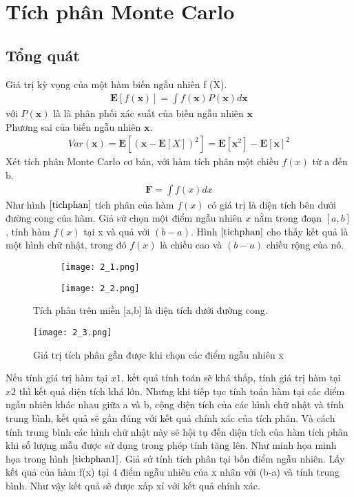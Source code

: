 \chapter{Tích phân Monte Carlo }\label{ch:2}
\section{Tổng quát}\label{sec:2.1}
Giá trị kỳ vọng của một hàm biến ngẫu nhiên f (X). 
\begin{align}
	\textbf{E}[f(\textbf{x})]=\int{f(\textbf{x})P(\textbf{x})d\textbf{x}} 
\end{align}
với $P(\textbf{x})$ là  là phân phối xác suất của biến ngẫu nhiên $\textbf{x}$\\
Phương sai của biến ngẫu nhiên $\textbf{x}$.
\begin{align}
	Var(\textbf{x})=\textbf{E}[(\textbf{x}-\textbf{E}[X])^2]=\textbf{E}[\textbf{x}^2]-\textbf{E}[\textbf{x}]^2
\end{align}
Xét tích phân Monte Carlo cơ bản, với hàm tích phân một chiều $f(x)$ từ a đến b.
\begin{align}
	\textbf{F}=\int{f(x)dx}
\end{align}
Như hình $ \ref{tichphan} $ tích phân của hàm $f(x)$ có giá trị là diện tích bên dưới đường cong của hàm. 
Giả sử chọn một điểm ngẫu nhiên $x$ nằm trong đoạn $[a, b]$, tính hàm $f(x)$ tại x và quả với $(b-a)$. Hình $ \ref{tichphan} $ cho thấy kết quả là một hình chữ nhật, trong đó $f(x)$ là chiều cao và $(b-a)$ chiều rộng của nó.
\begin{figure}[H]
	\centering
	\begin{subfigure}{5cm}
		\centering
		\texttt{[image: 2\_1.png]}
		\label{Sneutrino tadpole}
	\end{subfigure}
	\begin{subfigure}{5cm}
		\centering
		\texttt{[image: 2\_2.png]}
		\label{Sneutrino tadpole}
	\end{subfigure}
	\caption{Tích phân trên miền [a,b] là diện tích dưới đường cong.}\label{tichphan}
   \end{figure}
   \begin{figure}[H]
	\centering
	\texttt{[image: 2\_3.png]}
	\caption{Giá trị tích phân gần được khi chọn các điểm ngẫu nhiên x}\label{tichphan1}
   \end{figure}
   Nếu tính giá trị hàm tại $x1$, kết quả tính toán sẽ khá thấp, tính giá trị hàm tại $x2$ thì kết quả diện tích khá lớn. 
   Nhưng khi tiếp tục tính toán hàm tại các điểm ngẫu nhiên khác nhau giữa a và b, 
   cộng diện tích của các hình chữ nhật và tính trung bình, kết quả sẽ gần đúng với kết quả chính xác của tích phân.
   Và cách tính trung bình các hình chữ nhật này sẽ hội tụ đến diện tích của hàm tích phân khi số lượng mẫu được sử dụng trong phép tính tăng lên. 
   Như minh họa minh họa trong hình $ \ref{tichphan1} $. Giả sử tính tích phân tại bốn điểm ngẫu nhiên. 
   Lấy kết quả của hàm f(x) tại 4 điểm ngẫu nhiên của x nhân với (b-a) và tính trung bình. 
   Như vậy kết quả sẽ được xấp xỉ với kết quả chính xác.
